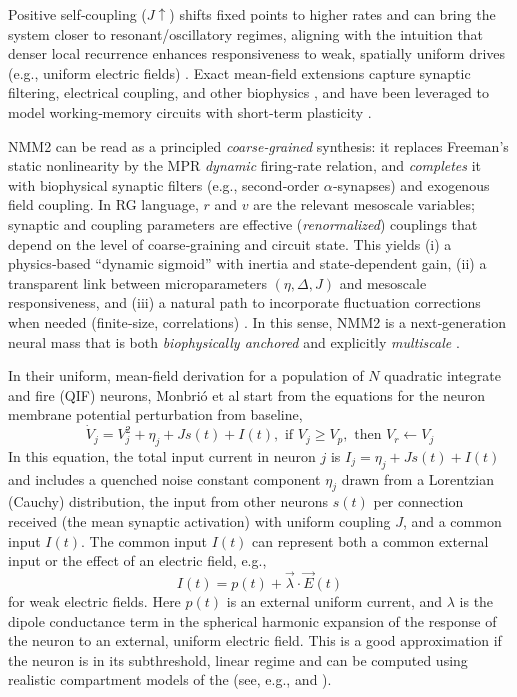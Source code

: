 \documentclass[12pt]{article}
\numberwithin{equation}{section}
\begin{document}
Positive self‑coupling ($J\!\uparrow$) shifts fixed points to higher rates and can bring the system closer to resonant/oscillatory regimes, aligning with the intuition that denser local recurrence enhances responsiveness to weak, spatially uniform drives (e.g., uniform electric fields) \cite{montbrioMacroscopicDescriptionNetworks2015, Byrne2020}. Exact mean‑field extensions capture synaptic filtering, electrical coupling, and other biophysics \cite{Devalle:2017aa,ruffiniAnalysisExtensionExact2022,clusellaComparisonExactHeuristic2023}, and have been leveraged to model working‑memory circuits with short‑term plasticity \cite{taherExactNeuralMass2020}.

 
NMM2 can be read as a principled \emph{coarse‑grained} synthesis: it replaces Freeman’s static nonlinearity by the MPR \emph{dynamic} firing‑rate relation, and \emph{completes} it with biophysical synaptic filters (e.g., second‑order $\alpha$‑synapses) and exogenous field coupling. In RG language, $r$ and $v$ are the relevant mesoscale variables; synaptic and coupling parameters are effective (\emph{renormalized}) couplings that depend on the level of coarse‑graining and circuit state. This yields (i) a physics‑based “dynamic sigmoid” with inertia and state‑dependent gain, (ii) a transparent link between microparameters $(\eta,\Delta,J)$ and mesoscale responsiveness, and (iii) a natural path to incorporate fluctuation corrections when needed (finite‑size, correlations) \cite{buiceSystematicFluctuationExpansion2010}. In this sense, NMM2 is a next‑generation neural mass that is both \emph{biophysically anchored} and explicitly \emph{multiscale} \cite{bickUnderstandingDynamicsBiological2020,breakspearDynamicModelsLargescale2017}.


In their uniform,  mean-field derivation for a population of $N$  quadratic integrate and fire (QIF) neurons, Monbri\'o et al \cite{Montbrio:2015aa}  start from the equations  for the neuron membrane potential perturbation from baseline,
\begin{equation} \label{eq:qif}
\dot V_j = V_j^2 + \eta_j + J s(t) + I(t), \mbox{ if } V_j \ge V_p, \mbox{ then } V_r \leftarrow V_j
\end{equation}
In this equation, the total input current in neuron $j$ is  $I_j =  \eta_j + J s(t) + I(t)$ and includes a quenched noise constant component $\eta_j$ drawn from a Lorentzian (Cauchy) distribution, the input from other neurons $s(t)$ per connection received (the mean synaptic activation) with uniform coupling $J$, and a common input $I(t)$. The common input $I(t)$ can  represent both a common external input or the effect of an electric field, e.g.,
\begin{equation}
 I(t) =  p(t) + \vec \lambda \cdot \vec E(t)   
\end{equation}
for weak electric fields.
Here $p(t)$ is an external uniform current, and $\lambda$ is the dipole conductance term in the spherical harmonic expansion of the response of the neuron to an external, uniform electric field.   This is a good approximation if the neuron is in its subthreshold, linear regime and can be computed using realistic compartment models of the  (see, e.g., \cite{aberra_biophysically_2018} and \cite{Galan:2021aa}). 
\end{document}
